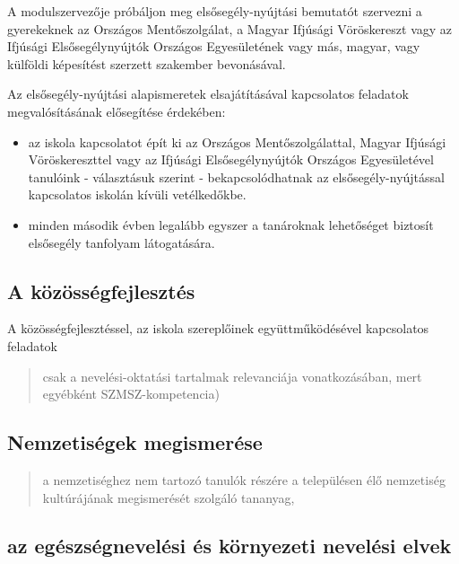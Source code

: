 A modulszervezője próbáljon meg elsősegély-nyújtási bemutatót szervezni a
gyerekeknek az Országos Mentőszolgálat, a Magyar Ifjúsági Vöröskereszt vagy az
Ifjúsági Elsősegélynyújtók Országos Egyesületének vagy más, magyar, vagy
külföldi képesítést szerzett szakember bevonásával.

Az elsősegély-nyújtási alapismeretek elsajátításával kapcsolatos feladatok
megvalósításának elősegítése érdekében:
\begin{itemize}
      \item az iskola kapcsolatot épít ki az Országos Mentőszolgálattal, Magyar
            Ifjúsági
            Vöröskereszttel vagy az Ifjúsági Elsősegélynyújtók Országos
            Egyesületével
            tanulóink - választásuk szerint - bekapcsolódhatnak az
            elsősegély-nyújtással
            kapcsolatos iskolán kívüli vetélkedőkbe.
      \item  minden második évben legalább egyszer a tanároknak lehetőséget
            biztosít
            elsősegély tanfolyam látogatására.

\end{itemize}

\subsection{A
      közösségfejlesztés}

A közösségfejlesztéssel, az iskola szereplőinek együttműködésével
kapcsolatos feladatok

\begin{quote}
      csak a nevelési-oktatási tartalmak relevanciája vonatkozásában, mert
      egyébként SZMSZ-kompetencia)
\end{quote}

\subsection{Nemzetiségek
      megismerése}\label{nemzetisuxe9gek-megismeruxe9se}

\begin{quote}
      a nemzetiséghez nem tartozó tanulók részére a településen élő nemzetiség
      kultúrájának megismerését szolgáló tananyag,
\end{quote}

\subsection{az egészségnevelési és környezeti nevelési elvek}

